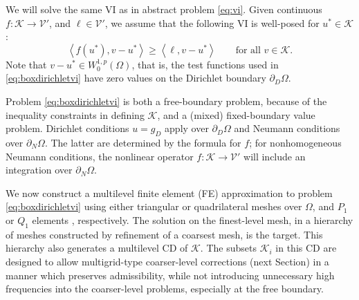 \documentclass[letterpaper,final,12pt,reqno]{amsart}
\theoremstyle{cstyle}
\theoremstyle{cstyle*}
\theoremstyle{dstyle}
\numberwithin{equation}{section}
\numberwithin{figure}{section}
\numberwithin{table}{section}
\numberwithin{theorem}{section}
\newcommand{\cK}{\mathcal{K}}
\newcommand{\cV}{\mathcal{V}}
\newcommand{\ip}[2]{\left<#1,#2\right>}
\begin{document}
We will solve the same VI as in abstract problem \eqref{eq:vi}.  Given continuous $f:\cK \to \cV'$, and $\ell \in \cV'$, we assume that the following VI is well-posed for $u^*\in \cK$:
\begin{equation}
\ip{f(u^*)}{v-u^*} \ge \ip{\ell}{v-u^*} \qquad \text{for all } v\in \cK. \label{eq:boxdirichletvi}
\end{equation}
Note that $v-u^* \in W_0^{1,p}(\Omega)$, that is, the test functions used in \eqref{eq:boxdirichletvi} have zero values on the Dirichlet boundary $\partial_D\Omega$.

Problem \eqref{eq:boxdirichletvi} is both a free-boundary problem, because of the inequality constraints in defining $\cK$, and a (mixed) fixed-boundary value problem.   Dirichlet conditions $u=g_D$ apply over $\partial_D\Omega$ and Neumann conditions over $\partial_N \Omega$.  The latter are determined by the formula for $f$; for nonhomogeneous Neumann conditions, the nonlinear operator $f:\cK\to\cV'$ will include an integration over $\partial_N\Omega$.

We now construct a multilevel finite element (FE) approximation to problem \eqref{eq:boxdirichletvi} using either triangular or quadrilateral meshes over $\Omega$, and $P_1$ or $Q_1$ elements \cite{Elmanetal2014}, respectively.  The solution on the finest-level mesh, in a hierarchy of meshes constructed by refinement of a coarsest mesh, is the target.   This hierarchy also generates a multilevel CD of $\cK$.  The subsets $\cK_i$ in this CD are designed to allow multigrid-type coarser-level corrections (next Section) in a manner which preserves admissibility, while not introducing unnecessary high frequencies into the coarser-level problems, especially at the free boundary.
\end{document}
